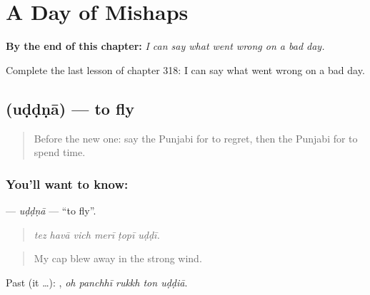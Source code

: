 
\chapter{A Day of Mishaps}
\label{ch:pa-a2-a-day-of-mishaps}

\begin{chapteropening}
\textbf{By the end of this chapter:} \emph{I can say what went wrong on a bad day.}

Complete the last lesson of chapter 318: I can say what went wrong on a bad day.
\end{chapteropening}

\section[\texorpdfstring{\pa{ਉੱਡਣਾ} (uḍḍṇā)}{ਉੱਡਣਾ (uḍḍṇā)}]{ (uḍḍṇā) — to fly}

\label{lesson:PA-C318-uddna}



\begin{quote}
Before the new one: say the Punjabi for to regret, then the Punjabi for to spend time.
\end{quote}

\subsection*{You'll want to know: }
\textbf{} — \emph{uḍḍṇā} — \textquotedblleft{}to fly\textquotedblright{}.

\begin{quote}
     
\end{quote}

\begin{quote}
\emph{tez havā vich merī ṭopī uḍḍī.}
\end{quote}

\begin{quote}
My cap blew away in the strong wind.
\end{quote}

Past (it …):     , \emph{oh panchhī rukkh ton uḍḍiā}.

